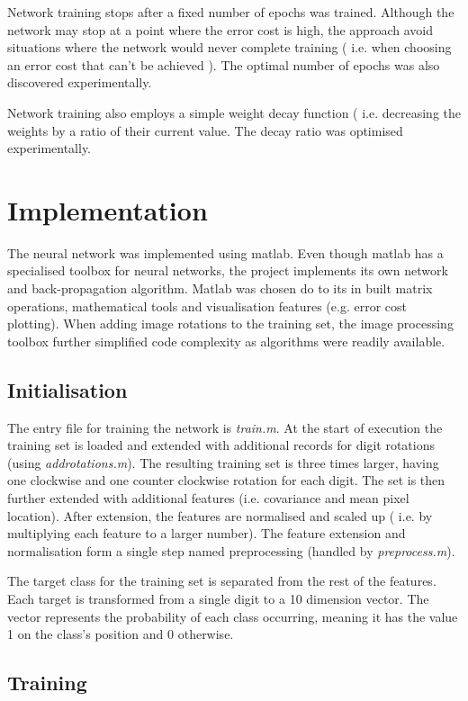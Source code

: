 \documentclass[11]{article}
\begin{document}
Network training stops after a fixed number of epochs was trained. Although the network may stop at a point where the error cost is high, the approach avoid situations where the network would never complete training ( i.e. when choosing an error cost that can't be achieved ). The optimal number of epochs was also discovered experimentally. 

Network training also employs a simple weight decay function ( i.e. decreasing the weights by a ratio of their current value. The decay ratio was optimised experimentally. 

\section{Implementation}

The neural network was implemented using matlab. Even though matlab has a specialised toolbox for neural networks, the project implements its own network and back-propagation algorithm. Matlab was chosen do to its in built matrix operations, mathematical tools and visualisation features (e.g. error cost plotting). When adding image rotations to the training set, the image processing toolbox further simplified code complexity as algorithms were readily available.

\subsection{Initialisation}

The entry file for training the network is \emph{train.m}. At the start of execution the training set is loaded and extended with additional records for digit rotations (using \emph{addrotations.m}). The resulting training set is three times larger, having one clockwise and one counter clockwise rotation for each digit. The set is then further extended with additional features (i.e. covariance and mean pixel location). After extension, the features are normalised and scaled up ( i.e. by multiplying each feature to a larger number). The feature extension and normalisation form a single step named preprocessing (handled by \emph{preprocess.m}).

The target class for the training set is separated from the rest of the features. Each target is transformed from a single digit to a 10 dimension vector. The vector represents the probability of each class occurring, meaning it has the value 1 on the class's position and 0 otherwise. 

\subsection{Training}
\end{document}
